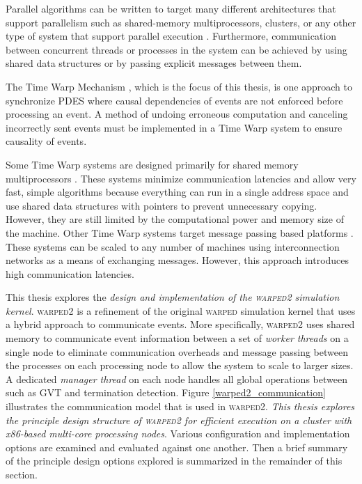 \documentclass[11pt]{book}
\begin{document}
Parallel algorithms can be written to target many different architectures that support parallelism
such as shared-memory multiprocessors, clusters, or any other type of system that support parallel
execution \cite{culler-97,patterson-11}.  Furthermore, communication between concurrent threads or
processes in the system can be achieved by using shared data structures or by passing explicit
messages between them.

The Time Warp Mechanism \cite{jefferson-85,fujimoto-90}, which is the focus of this thesis, is one
approach to synchronize PDES where causal dependencies of events are not enforced before processing
an event.  A method of undoing erroneous computation and canceling incorrectly sent events must be
implemented in a Time Warp system to ensure causality of events.

Some Time Warp systems are designed primarily for shared memory multiprocessors \cite{das-94}.
These systems minimize communication latencies and allow very fast, simple algorithms because
everything can run in a single address space and use shared data structures with pointers to
prevent unnecessary copying.  However, they are still limited by the computational power and memory
size of the machine.  Other Time Warp systems target message passing based platforms
\cite{carothers-00,ramanan-98-iscope}.  These systems can be scaled to any number of machines using
interconnection networks as a means of exchanging messages.  However, this approach introduces high
communication latencies.

This thesis explores the \emph{design and implementation of the \textsc{warped2} simulation kernel}.
\textsc{warped2} is a refinement of the original \textsc{warped} simulation kernel
\cite{martin-96,ramanan-98-iscope} that uses a hybrid approach to communicate events.  More
specifically, \textsc{warped2} uses shared memory to communicate event information between a set of
\emph{worker threads} on a single node to eliminate communication overheads and message passing
between the processes on each processing node to allow the system to scale to larger sizes.  A
dedicated \emph{manager thread} on each node handles all global operations between such as GVT and
termination detection.  Figure \ref{warped2_communication} illustrates the communication model that
is used in \textsc{warped2}.  \emph{This thesis explores the principle design structure of
\textsc{warped2} for efficient execution on a cluster with x86-based multi-core processing nodes}.
Various configuration and implementation options are examined and evaluated against one another.
Then a brief summary of the principle design options explored is summarized in the remainder of this
section.
\end{document}

